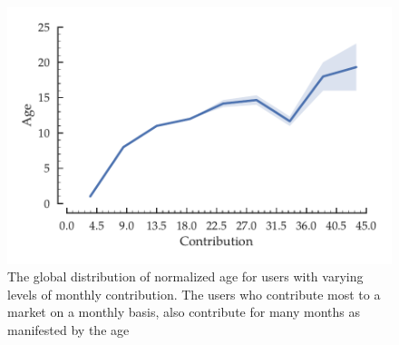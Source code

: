 \begin{figure}[hbt]
\centering
\includegraphics[scale=0.5]{Figures/Age_vs_Contribution.pdf}
\caption{The global distribution of normalized age for users with varying levels of monthly contribution. The users who contribute most to a market on a monthly basis, also contribute for many months as manifested by the age}
\label{fig:age_vs_contribution}
\end{figure}


